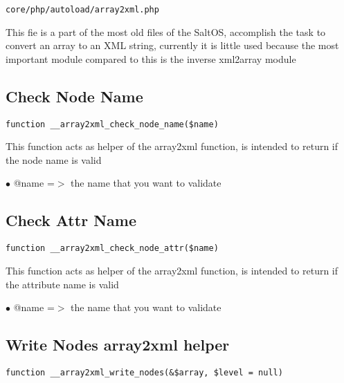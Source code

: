 \documentclass[a4paper]{book}
\begin{document}
\begin{lstlisting}
core/php/autoload/array2xml.php
\end{lstlisting}

This fie is a part of the most old files of the SaltOS, accomplish the task to convert an array
to an XML string, currently it is little used because the most important module compared to this
is the inverse xml2array module

\hypertarget{toc32}{}
\subsection{Check Node Name}

\begin{lstlisting}
function __array2xml_check_node_name($name)
\end{lstlisting}

This function acts as helper of the array2xml function, is intended to
return if the node name is valid

\begin{compactitem}
\item[\color{myblue}$\bullet$] @name =$>$ the name that you want to validate
\end{compactitem}

\hypertarget{toc33}{}
\subsection{Check Attr Name}

\begin{lstlisting}
function __array2xml_check_node_attr($name)
\end{lstlisting}

This function acts as helper of the array2xml function, is intended to
return if the attribute name is valid

\begin{compactitem}
\item[\color{myblue}$\bullet$] @name =$>$ the name that you want to validate
\end{compactitem}

\hypertarget{toc34}{}
\subsection{Write Nodes array2xml helper}

\begin{lstlisting}
function __array2xml_write_nodes(&$array, $level = null)
\end{lstlisting}
\end{document}
